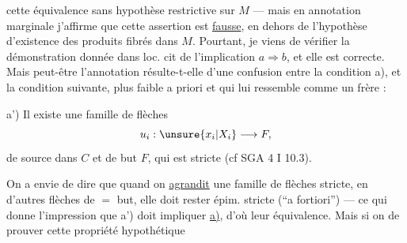 cette équivalence sans hypothèse restrictive sur
$M$ --- mais en annotation marginale
j'affirme que cette assertion est \uline{fausse},
en dehors de l'hypothèse d'existence des
produits fibrés dans $M$. Pourtant, je
viens de vérifier la démonstration donnée
dans loc. cit de l'implication $a\Longrightarrow b$,
et elle est correcte. Mais peut-être l'annotation résulte-t-elle d'une confusion
entre la condition a), et  la condition suivante, plus faible a priori et qui
lui ressemble comme un frère :

a') Il existe une famille de flèches
\[
u_i:\unsure{x_i|X_i}\longrightarrow F,
\]
de source dans $C$ et
de but $F$, qui est 
stricte (cf SGA 4 I 10.3).

On a envie de dire que quand on \uline{agrandit}
une famille de flèches 
stricte, en   d'autres flèches de
$=$ but, elle doit rester épim.
stricte (``a fortiori'') --- ce qui donne
l'impression que a') doit impliquer \uline{a)},
d'où leur  équivalence. Mais si on  de prouver cette propriété hypothétique 
